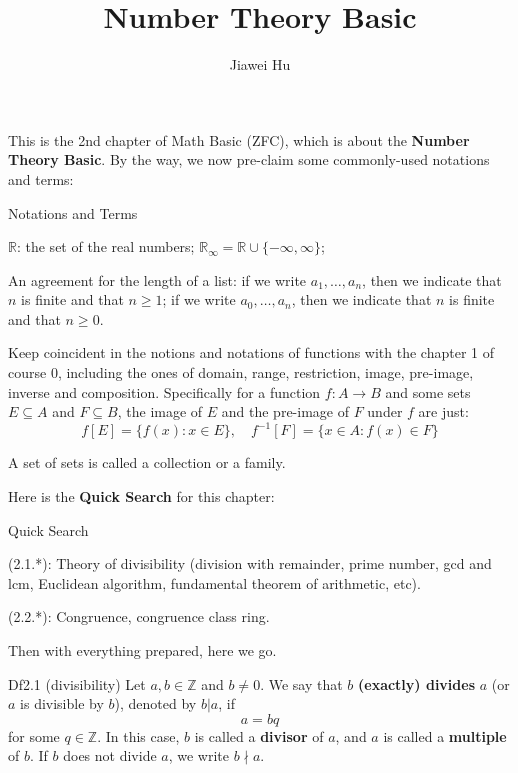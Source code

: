 \documentclass{article}
\title{\LARGE \textbf{Number Theory Basic}}
\author{\large Jiawei Hu}
\begin{document}
\maketitle

This is the 2nd chapter of Math Basic (ZFC), which is about the \textbf{Number Theory Basic}. By the way, we now pre-claim some commonly-used notations and terms:
\begin{Df}{Notations and Terms}
    \begin{compactenum}
        \item $\mathbb{R}$: the set of the real numbers; $\mathbb{R}_\infty = \mathbb{R}\cup\{-\infty, \infty\}$;
        \item An agreement for the length of a list: if we write $a_1, \dots, a_n$, then we indicate that $n$ is finite and that $n\geq 1$; if we write $a_0, \dots, a_n$, then we indicate that $n$ is finite and that $n\geq 0$.
        \item Keep coincident in the notions and notations of functions with the chapter 1 of course 0, including the ones of domain, range, restriction, image, pre-image, inverse and composition. Specifically for a function $f: A\rightarrow B$ and some sets $E\subseteq A$ and $F\subseteq B$, the image of $E$ and the pre-image of $F$ under $f$ are just:
        $$f[E] = \{f(x): x\in E\},\quad f^{-1}[F] = \{x\in A: f(x)\in F\}$$
        \item A set of sets is called a collection or a family.
    \end{compactenum}
\end{Df}

Here is the \textbf{Quick Search} for this chapter:
\begin{Th}{Quick Search}
    \begin{compactdesc}
        \item (2.1.*): Theory of divisibility (division with remainder, prime number, gcd and lcm, Euclidean algorithm, fundamental theorem of arithmetic, etc).
        \item (2.2.*): Congruence, congruence class ring.
    \end{compactdesc}
\end{Th}

Then with everything prepared, here we go. 

\begin{Df}{Df2.1 (divisibility)}
    Let $a, b\in\mathbb{Z}$ and $b\neq 0$. We say that $b$ \textbf{(exactly) divides} $a$ (or $a$ is divisible by $b$), denoted by $b|a$, if
    $$a = bq $$
    for some $q\in\mathbb{Z}$. In this case, $b$ is called a \textbf{divisor} of $a$, and $a$ is called a \textbf{multiple} of $b$. If $b$ does not divide $a$, we write $b\nmid a$.
\end{Df}
\end{document}
